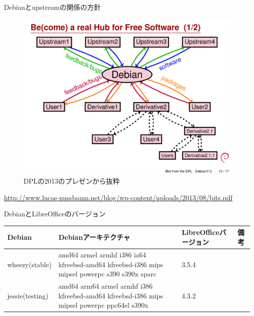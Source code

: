 \begin{frame}{Debianとupstreamの関係の方針}

\begin{figure}[H]
\begin{center}
 \includegraphics[width=0.7\hsize]{image201410/debian-hub.png}
\end{center}
\caption{DPLの2013のプレゼンから抜粋}
\end{figure}

\url{http://www.lucas-nussbaum.net/blog/wp-content/uploads/2013/08/bits.pdf}

\end{frame}

\begin{frame}{DebianとLibreOfficeのバージョン}

\begin{table}[ht]
\begin{center}
\small
\begin{tabular}{|l|p{3cm}|l|l|}
\hline 
Debian&Debianアーキテクチャ&LibreOfficeバージョン& 備考\\ \hline \hline
wheezy(stable) & amd64 armel armhf i386 ia64 kfreebsd-amd64 kfreebsd-i386 mips mipsel powerpc s390 s390x sparc & 3.5.4 & \\ \hline
jessie(testing) & amd64 arm64 armel armhf i386 kfreebsd-amd64 kfreebsd-i386 mips mipsel powerpc ppc64el s390x & 4.3.2 & \\ \hline
\end{tabular}
\end{center}
\end{table}

\end{frame}

